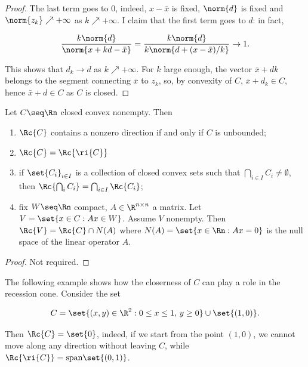 \begin{proof}
    The last term goes to 0, indeed, $x - \bar{x}$ is fixed, $\norm{d}$ is fixed and $\norm{z_k} \nearrow +\infty$ as $k \nearrow +\infty$. I claim that the first term goes to $d$: in fact,

    \[ \frac{k\norm{d}}{\norm{x + kd - \bar{x}}} = \frac{k\norm{d}}{k \norm{d + (x - \bar{x})/k}} \to 1. \]

    This shows that $d_k \to d$ as $k \nearrow +\infty$. For $k$ large enough, the vector $\bar{x} + dk$ belongs to the segment connecting $\bar{x}$ to $z_k$, so, by convexity of $C$, $\bar{x} + d_k \in C$, hence $\bar{x} + d \in C$ as $C$ is closed.

\end{proof}

\begin{proposition}
    
    Let $C \seq \Rn$ closed convex nonempty. Then 

    \begin{enumerate}
        \item[a)] $\Rc{C}$ contains a nonzero direction if and only if $C$ is unbounded;
        \item[b)] $\Rc{C} = \Rc{\ri{C}}$
        \item[c)] if $\set{C_i}_{i \in I}$ is a collection of closed convex sets such that $\displaystyle\bigcap_{i \in I} C_i \neq \emptyset$, then $\Rc{\bigcap_i C_i} = \bigcap_{i \in I} \Rc{C_i}$;
        \item[d)] fix $W \seq \Rn$ compact, $A \in \R^{n\times n}$ a matrix. Let $V = \set{x \in C : Ax  \in W}$. Assume $V$ nonempty. Then $\Rc{V} = \Rc{C} \cap N(A)$ where $N(A) = \set{x \in \Rn : Ax = 0}$ is the null space of the linear operator $A$.
    \end{enumerate}

\end{proposition}

\begin{proof}
    Not required.
\end{proof}

\begin{example}

    The following example shows how the closerness of $C$ can play a role in the recession cone. Consider the set 

    \[ C = \set{(x,y) \in \R^2 : 0 \le x \le 1,\, y \ge 0} \cup \set{(1,0)}. \]

    Then $\Rc{C} = \set{0}$, indeed, if we start from the point $(1,0)$, we cannot move along any direction without leaving $C$, while $\Rc{\ri{C}} = \mathrm{span}\set{(0,1)}$. 
    
\end{example}

